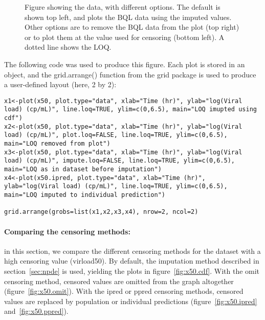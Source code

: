 \begin{figure}[!h]
\par\kern -0.3cm
\begin{center}
\end{center}
\caption{Figure showing the data, with different options. The default is shown top left, and plots the BQL data using the imputed values. Other options are to remove the BQL data from the plot (top right) or to plot them at the value used for censoring (bottom left). A dotted line shows the LOQ.}\label{fig:x50.data}
\end{figure}

The following code was used to produce this figure. Each plot is stored in an object, and the {\sf grid.arrange()} function from the {\sf grid} package is used to produce a user-defined layout (here, 2 by 2):
\begin{verbatim}
x1<-plot(x50, plot.type="data", xlab="Time (hr)", ylab="log(Viral load) (cp/mL)", line.loq=TRUE, ylim=c(0,6.5), main="LOQ imupted using cdf")
x2<-plot(x50, plot.type="data", xlab="Time (hr)", ylab="log(Viral load) (cp/mL)", plot.loq=FALSE, line.loq=TRUE, ylim=c(0,6.5), main="LOQ removed from plot")
x3<-plot(x50, plot.type="data", xlab="Time (hr)", ylab="log(Viral load) (cp/mL)", impute.loq=FALSE, line.loq=TRUE, ylim=c(0,6.5), main="LOQ as in dataset before imputation")
x4<-plot(x50.ipred, plot.type="data", xlab="Time (hr)", ylab="log(Viral load) (cp/mL)", line.loq=TRUE, ylim=c(0,6.5), main="LOQ imputed to individual prediction")

grid.arrange(grobs=list(x1,x2,x3,x4), nrow=2, ncol=2)
\end{verbatim} 

\paragraph{Comparing the censoring methods:} in this section, we compare the different censoring methods for the dataset with a high censoring value (virload50). By default, the imputation method described in section~\ref{sec:npde} is used, yielding the plots in figure~\ref{fig:x50.cdf}. With the {\sf omit} censoring method, censored values are omitted from the graph altogether (figure~\ref{fig:x50.omit}). With the {\sf ipred} or {\sf ppred} censoring methods, censored values are replaced by population or individual predictions (figure~\ref{fig:x50.ipred} and~\ref{fig:x50.ppred}).

